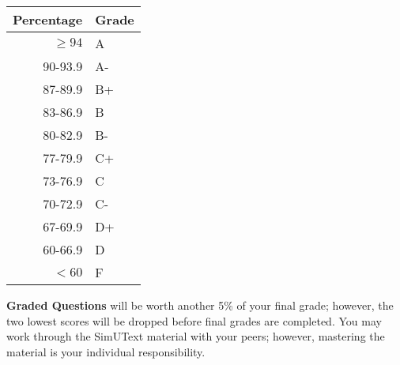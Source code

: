 \documentclass{tufte-handout}
\begin{document}
\begin{margintable}
\begin{tabular}{rl}
Percentage & Grade \\
\hline 
$\ge94$ & A \\
90-93.9 & A- \\
87-89.9 & B+ \\
83-86.9 & B \\
80-82.9 & B- \\
77-79.9 & C+ \\
73-76.9 & C \\
70-72.9 & C- \\
67-69.9 & D+ \\
60-66.9 & D \\
$<60$ & F \\
\hline
\end{tabular}
\end{margintable}


\textbf{Graded Questions} will be worth another 5\% of your final grade; however, the two lowest scores will be dropped before final grades are completed. You may work through the SimUText material with your peers; however, mastering the material is your individual responsibility.
\end{document}
